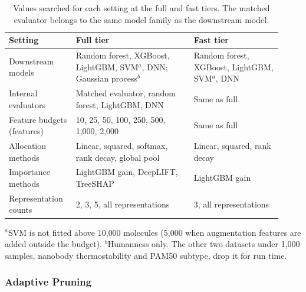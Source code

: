 \begin{table}[htbp]
\centering
\begin{adjustbox}{max width=\textwidth,max totalheight=0.78\textheight}
\begin{tabular}{@{}P{0.22\linewidth}P{0.40\linewidth}P{0.30\linewidth}@{}}
\toprule
Setting & Full tier & Fast tier \\
\midrule
Downstream models & Random forest, XGBoost, LightGBM, SVM$^{a}$, DNN; Gaussian process$^{b}$ & Random forest, XGBoost, LightGBM, SVM$^{a}$, DNN \\
Internal evaluators & Matched evaluator, random forest, LightGBM, DNN & Same as full \\
Feature budgets (features) & 10, 25, 50, 100, 250, 500, 1{,}000, 2{,}000 & Same as full \\
Allocation methods & Linear, squared, softmax, rank decay, global pool & Linear, squared, rank decay \\
Importance methods & LightGBM gain, DeepLIFT, TreeSHAP & LightGBM gain \\
Representation counts & 2, 3, 5, all representations & 3, all representations \\
\bottomrule
\end{tabular}
\end{adjustbox}

\smallskip
{\footnotesize $^{a}$SVM is not fitted above 10{,}000 molecules (5{,}000 when augmentation features are added outside the budget). $^{b}$Humanness only. The other two datasets under 1{,}000 samples, nanobody thermostability and PAM50 subtype, drop it for run time.}
\caption[Values searched for each setting at the two search tiers.]{Values searched for each setting at the full and fast tiers. The matched evaluator belongs to the same model family as the downstream model.}
\label{tab:search_tiers}
\end{table}

\subsubsection{Adaptive Pruning}


